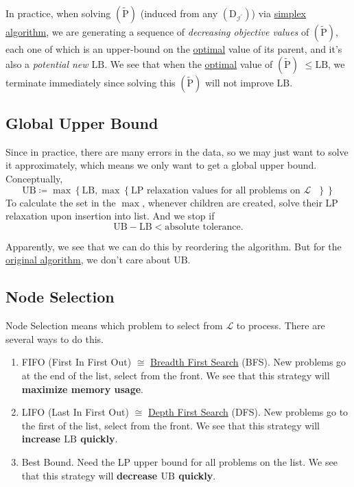 \begin{remark}
	In practice, when solving \((\widetilde{\mathrm{P}})\) (induced from any \((\mathrm{D}_{\mathcal{I} ^\prime})\)) via \hyperref[algo:simplex-algorithm]{simplex algorithm}, we are generating a sequence of \emph{decreasing objective values} of \((\widetilde{\mathrm{P}})\), each one of which is an upper-bound on the \hyperref[def:optimal-solution]{optimal} value of its parent, and it's also a \emph{potential new \(\mathrm{LB}\)}. We see that when the \hyperref[def:optimal-solution]{optimal} value of \((\widetilde{\mathrm{P}})\) \(\leq \mathrm{LB}\), we terminate immediately since solving this \((\widetilde{\mathrm{P}})\) will not improve \(\mathrm{LB}\).
\end{remark}

\subsection{Global Upper Bound}
Since in practice, there are many errors in the data, so we may just want to solve it approximately, which means we only want to get a global upper bound. Conceptually,
\[
	\mathrm{UB} \coloneqq \max\left\{\mathrm{LB}, \max\left\{\text{\(\mathrm{LP}\) relaxation values for all problems on \(\mathcal{L}\) }\right\}\right\}
\]
To calculate the set in the \(\max\), whenever children are created, solve their LP relaxation upon insertion into list. And we stop if
\[
	\mathrm{UB} - \mathrm{LB} < \text{absolute tolerance}.
\]

\begin{remark}
	Apparently, we see that we can do this by reordering the algorithm. But for the \hyperref[algo:branch-and-bound-algorithm]{original algorithm}, we don't care about \(\mathrm{UB}\).
\end{remark}

\subsection{Node Selection}\label{subsec:node-selection}
Node Selection means which problem to select from \(\mathcal{L} \) to process. There are several ways to do this.

\begin{enumerate}
	\item FIFO (First In First Out) \(\cong\) \href{https://en.wikipedia.org/wiki/Breadth-first_search}{Breadth First Search} (BFS). New problems go at the end of the list, select from the front. We see that this strategy will \textbf{maximize memory usage}.
	\item LIFO (Last In First Out) \(\cong\) \href{https://en.wikipedia.org/wiki/Depth-first_search}{Depth First Search} (DFS). New problems go to the first of the list, select from the front. We see that this strategy will \textbf{increase \(\mathrm{LB}\) quickly}.
	\item Best Bound. Need the LP upper bound for all problems on the list. We see that this strategy will \textbf{decrease \(\mathrm{UB}\) quickly}.
\end{enumerate}


